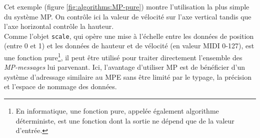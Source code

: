 \noindent Cet exemple (figure \ref{fig:algorithms:MP-pure}) montre l'utilisation la plus simple du système MP. On contrôle ici la valeur de vélocité sur l'axe vertical tandis que l'axe horizontal contrôle la hauteur.\\
\indent Comme l'objet \verb|scale|, qui opère une mise à l'échelle entre les données de position (entre 0 et 1) et les données de hauteur et de vélocité (en valeur \gls{MIDI} 0-127), est une fonction pure\footnote{En informatique, une fonction pure, appelée également algorithme déterministe, est une fonction dont la sortie ne dépend que de la valeur d'entrée.}, il peut être utilisé pour traiter directement l'ensemble des \textit{MP-messages} lui parvenant. Ici, l'avantage d'utiliser MP est de bénéficier d'un système d'adressage similaire au \gls{MPE} sans être limité par le typage, la précision et l'espace de nommage des données.

